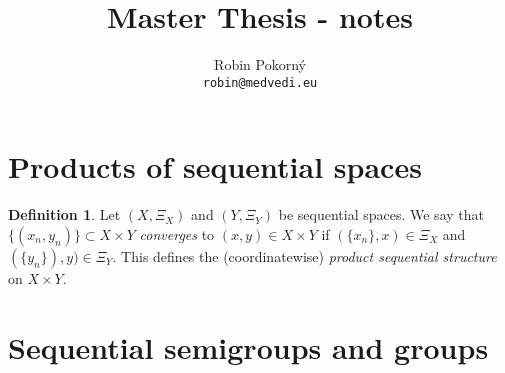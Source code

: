 \documentclass[12pt]{article}
\title{Master Thesis - notes}
\author{Robin Pokorný\\
\small \texttt{robin@medvedi.eu}\\
}
\date{}
\theoremstyle{definition}
\newtheorem{define}[theorem]{Definition}
\theoremstyle{remark}
\begin{document}
\maketitle

\section*{Products of sequential spaces}

\begin{define}\label{def:prodseq}
Let $(X, \Xi_X)$ and $(Y, \Xi_Y)$ be sequential spaces. We say that $\{(x_n, y_n)\}\subset X\times Y$ \emph{converges} to $(x, y)\in X\times Y$ if $(\{x_n\}, x)\in \Xi_X$ and $(\{y_n\}), y)\in \Xi_Y$.
This defines the (coordinatewise) \emph{product sequential structure} on $X\times Y$.
\end{define}

\section*{Sequential semigroups and groups}
\end{document}
